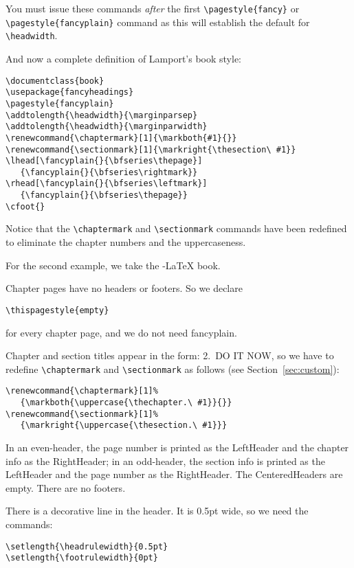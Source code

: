 \documentclass[a4paper]{article}
\def\latex/{\protect\LaTeX{}}
\def\ams/{\protect\pAmS}
\def\pAmS{{\the\textfont2
        A\kern-.1667em\lower.5ex\hbox{M}\kern-.125emS}}
\def\amslatex/{\ams/-\latex/}
\begin{document}
\begin{flushleft}
You must issue these commands \emph{after} the first
\verb|\pagestyle{fancy}| or \verb|\pagestyle{fancyplain}| command as this
will establish the default for \verb|\headwidth|.
\end{flushleft}

And now a complete definition of Lamport's book style:

\begin{verbatim}
\documentclass{book}
\usepackage{fancyheadings}
\pagestyle{fancyplain}
\addtolength{\headwidth}{\marginparsep}
\addtolength{\headwidth}{\marginparwidth}
\renewcommand{\chaptermark}[1]{\markboth{#1}{}}
\renewcommand{\sectionmark}[1]{\markright{\thesection\ #1}}
\lhead[\fancyplain{}{\bfseries\thepage}]
   {\fancyplain{}{\bfseries\rightmark}}
\rhead[\fancyplain{}{\bfseries\leftmark}]
   {\fancyplain{}{\bfseries\thepage}}
\cfoot{}
\end{verbatim}

Notice that the \verb|\chaptermark| and \verb|\sectionmark| commands have
been redefined to eliminate the chapter numbers and the uppercaseness.

For the second example, we take the \amslatex/ book.%

Chapter pages have no headers or footers.  So we declare

\begin{verbatim}
\thispagestyle{empty}
\end{verbatim}
for every chapter page, and we do not need fancyplain.

Chapter and section titles appear in the form: 2.\ DO IT NOW, so we have
to redefine \verb|\chaptermark| and \verb|\sectionmark| as follows (see
Section~\ref{sec:custom}):

\begin{verbatim}
\renewcommand{\chaptermark}[1]%
   {\markboth{\uppercase{\thechapter.\ #1}}{}}
\renewcommand{\sectionmark}[1]%
   {\markright{\uppercase{\thesection.\ #1}}}
\end{verbatim}

In an even-header, the page number is printed as the LeftHeader and
the chapter info as the RightHeader; in an odd-header, the section info
is printed as the LeftHeader and the page number as the RightHeader.  The
CenteredHeaders are empty.  There are no footers.

There is a decorative line in the header.  It is 0.5pt wide, so we need
the commands:

\begin{verbatim}
\setlength{\headrulewidth}{0.5pt}
\setlength{\footrulewidth}{0pt}
\end{verbatim}
\end{document}
